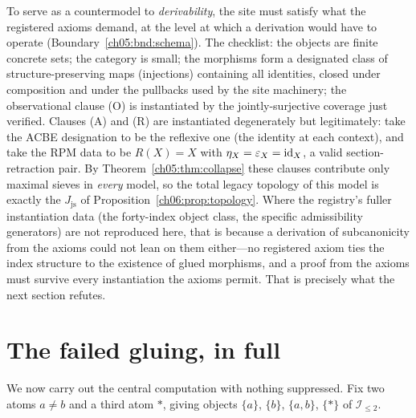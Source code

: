 \begin{remark}\label{ch06:rem:instantiation}
To serve as a countermodel to \emph{derivability}, the site must satisfy
what the registered axioms demand, at the level at which a derivation would
have to operate (Boundary~\ref{ch05:bnd:schema}). The checklist: the objects
are finite concrete sets; the category is small; the morphisms form a
designated class of structure-preserving maps (injections) containing all
identities, closed under composition and under the pullbacks used by the
site machinery; the observational clause (O) is instantiated by the
jointly-surjective coverage just verified. Clauses (A) and (R) are
instantiated degenerately but legitimately: take the ACBE designation to be
the reflexive one (the identity at each context), and take the RPM data to
be $R(X)=X$ with $\eta_X=\varepsilon_X=\mathrm{id}_X$, a valid section-retraction
pair. By Theorem~\ref{ch05:thm:collapse} these clauses contribute only
maximal sieves in \emph{every} model, so the total legacy topology of this
model is exactly the $J_{\mathrm{js}}$ of
Proposition~\ref{ch06:prop:topology}. Where the registry's fuller
instantiation data (the forty-index object class, the specific admissibility
generators) are not reproduced here, that is because a derivation of
subcanonicity from the axioms could not lean on them either---no registered
axiom ties the index structure to the existence of glued morphisms, and a
proof from the axioms must survive every instantiation the axioms permit.
That is precisely what the next section refutes.
\end{remark}

\section{The failed gluing, in full}\label{ch06:sec:failure}

We now carry out the central computation with nothing suppressed. Fix two
atoms $a\ne b$ and a third atom $*$, giving objects $\{a\}$, $\{b\}$,
$\{a,b\}$, $\{*\}$ of $\mathcal{I}_{\le 2}$.

